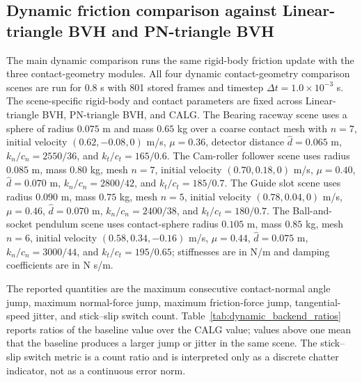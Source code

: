 \documentclass[preprint,12pt]{elsarticle}
\newcommand{\calg}{\textsc{CALG}}
\begin{document}
\FloatBarrier

\subsection{Dynamic friction comparison against Linear-triangle BVH and PN-triangle BVH}

The main dynamic comparison runs the same rigid-body friction update with the three contact-geometry modules. All four dynamic contact-geometry comparison scenes are run for $0.8$ s with 801 stored frames and timestep $\Delta t=1.0\times10^{-3}$ s. The scene-specific rigid-body and contact parameters are fixed across Linear-triangle BVH, PN-triangle BVH, and \calg{}. The Bearing raceway scene uses a sphere of radius $0.075$ m and mass $0.65$ kg over a coarse contact mesh with $n=7$, initial velocity $(0.62,-0.08,0)$ m/s, $\mu=0.36$, detector distance $\hat d=0.065$ m, $k_n/c_n=2550/36$, and $k_t/c_t=165/0.6$. The Cam-roller follower scene uses radius $0.085$ m, mass $0.80$ kg, mesh $n=7$, initial velocity $(0.70,0.18,0)$ m/s, $\mu=0.40$, $\hat d=0.070$ m, $k_n/c_n=2800/42$, and $k_t/c_t=185/0.7$. The Guide slot scene uses radius $0.090$ m, mass $0.75$ kg, mesh $n=5$, initial velocity $(0.78,0.04,0)$ m/s, $\mu=0.46$, $\hat d=0.070$ m, $k_n/c_n=2400/38$, and $k_t/c_t=180/0.7$. The Ball-and-socket pendulum scene uses contact-sphere radius $0.105$ m, mass $0.85$ kg, mesh $n=6$, initial velocity $(0.58,0.34,-0.16)$ m/s, $\mu=0.44$, $\hat d=0.075$ m, $k_n/c_n=3000/44$, and $k_t/c_t=195/0.65$; stiffnesses are in N/m and damping coefficients are in N s/m.

The reported quantities are the maximum consecutive contact-normal angle jump, maximum normal-force jump, maximum friction-force jump, tangential-speed jitter, and stick--slip switch count. Table~\ref{tab:dynamic_backend_ratios} reports ratios of the baseline value over the \calg{} value; values above one mean that the baseline produces a larger jump or jitter in the same scene. The stick--slip switch metric is a count ratio and is interpreted only as a discrete chatter indicator, not as a continuous error norm.
\end{document}
